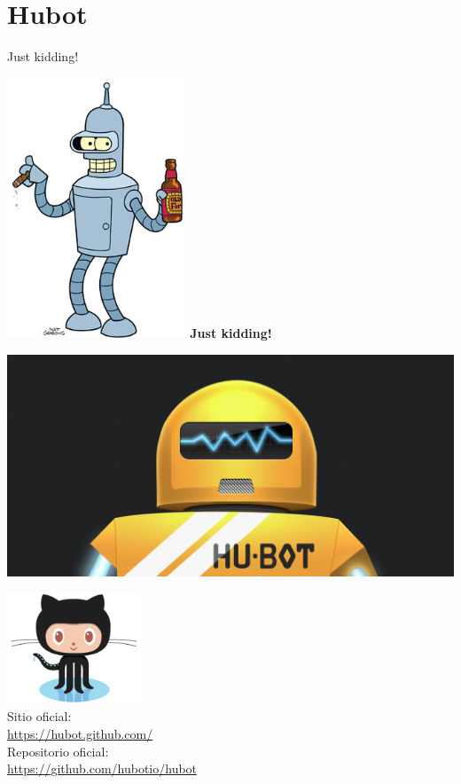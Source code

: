 \documentclass[usenames,dvipsnames]{beamer}
\begin{document}
  \section{Hubot}
  \begin{frame}{Just kidding!}
    \begin{center}
      \includegraphics[width=0.4\textwidth]{imgs/bender}
      \textbf{Just kidding!}
    \end{center}
  \end{frame}

  \begin{frame}[standout]
    \begin{center}
      \hspace*{-3cm}
      \includegraphics[width=1.5\textwidth]{imgs/hubot2}
    \end{center}
  \end{frame}

  \begin{frame}[standout]
    \includegraphics[width=0.3\textwidth]{imgs/Octocat}\\
    Sitio oficial:\\
    {\color{orange} \url{https://hubot.github.com/}}\\
    \vspace*{0.5cm}
    Repositorio oficial:\\
    {\color{orange} \url{https://github.com/hubotio/hubot}}\\
  \end{frame}
\end{document}
